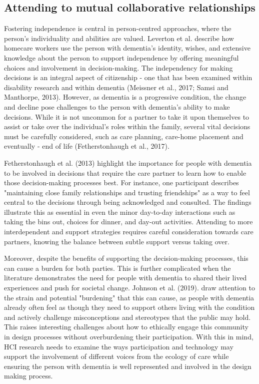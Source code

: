 \subsection{Attending to mutual collaborative relationships}
\label{BL:gap:relationships}
Fostering independence is central in person-centred approaches, where the person's individuality and abilities are valued. Leverton et al. describe how homecare workers use the person with dementia's identity, wishes, and extensive knowledge about the person to support independence by offering meaningful choices and involvement in decision-making. The independency for making decisions is an integral aspect of citizenship - one that has been examined within disability research and within dementia (Meissner et al., 2017; Samsi and Manthorpe, 2013). However, as dementia is a progressive condition, the change and decline pose challenges to the person with dementia's ability to make decisions. While it is not uncommon for a partner to take it upon themselves to assist or take over the individual's roles within the family, several vital decisions must be carefully considered, such as care planning, care-home placement and eventually - end of life (Fetherstonhaugh et al., 2017).

Fetherstonhaugh et al. (2013) highlight the importance for people with dementia to be involved in decisions that require the care partner to learn how to enable those decision-making processes best. For instance, one participant describes "maintaining close family relationships and trusting friendships" as a way to feel central to the decisions through being acknowledged and consulted. The findings illustrate this as essential in even the minor day-to-day interactions such as taking the bins out, choices for dinner, and day-out activities. Attending to more interdependent and support strategies requires careful consideration towards care partners, knowing the balance between subtle support versus taking over.

Moreover, despite the benefits of supporting the decision-making processes, this can cause a burden for both parties. This is further complicated when the literature demonstrates the need for people with dementia to shared their lived experiences and push for societal change. Johnson et al. (2019). draw attention to the strain and potential "burdening" that this can cause, as people with dementia already often feel as though they need to support others living with the condition and actively challenge misconceptions and stereotypes that the public may hold. This raises interesting challenges about how to ethically engage this community in design processes without overburdening their participation. With this in mind, HCI research needs to examine the ways participation and technology may support the involvement of different voices from the ecology of care while ensuring the person with dementia is well represented and involved in the design making process. 

